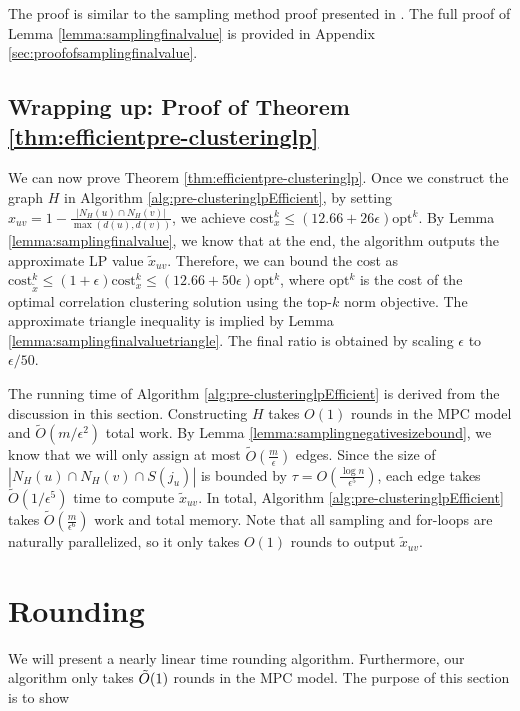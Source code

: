\documentclass[11pt]{article}
\newcommand{\cost}{\mathrm{cost}}
\newcommand{\opt}{{\mathrm{opt}}}
\begin{document}
\begin{CJK*}{UTF8}{gbsn}
The proof is similar to the sampling method proof presented in \cite{davies2023fast}. The full proof of Lemma \ref{lemma:samplingfinalvalue} is provided in Appendix \ref{sec:proofofsamplingfinalvalue}.

\subsection{Wrapping up: Proof of Theorem \ref{thm:efficientpre-clusteringlp}}

We can now prove Theorem \ref{thm:efficientpre-clusteringlp}. Once we construct the graph $H$ in Algorithm \ref{alg:pre-clusteringlpEfficient}, by setting $x_{uv} = 1 - \frac{|N_H(u) \cap N_H(v)|}{\max(d(u), d(v))}$, we achieve $\cost^k_x \leq (12.66 + 26\epsilon) \opt^k$. By Lemma \ref{lemma:samplingfinalvalue}, we know that at the end, the algorithm outputs the approximate LP value $\tilde{x}_{uv}$. Therefore, we can bound the cost as $\cost^k_{\tilde{x}} \leq (1 + \epsilon) \cost^k_x \leq (12.66 + 50\epsilon) \opt^k$, where $\opt^k$ is the cost of the optimal correlation clustering solution using the top-$k$ norm objective. The approximate triangle inequality is implied by Lemma \ref{lemma:samplingfinalvaluetriangle}. The final ratio is obtained by scaling $\epsilon$ to $\epsilon / 50$.

The running time of Algorithm \ref{alg:pre-clusteringlpEfficient} is derived from the discussion in this section. Constructing $H$ takes $O(1)$ rounds in the MPC model and $\tilde{O}(m /\epsilon^2)$ total work. By Lemma \ref{lemma:samplingnegativesizebound}, we know that we will only assign at most $\tilde{O}(\frac{m}{\epsilon})$ edges. Since the size of $|N_H(u) \cap N_H(v) \cap S(j_u)|$ is bounded by $\tau = O(\frac{\log n}{\epsilon^5})$, each edge takes $\tilde{O}(1/\epsilon^5)$ time to compute $\tilde{x}_{uv}$. In total, Algorithm \ref{alg:pre-clusteringlpEfficient} takes $\tilde{O}(\frac{m}{\epsilon^6})$ work and total memory. Note that all sampling and for-loops are naturally parallelized, so it only takes $O(1)$ rounds to output $\tilde{x}_{uv}$.



 
\section{Rounding}
\label{sec:MPC-solve-rounding}
We will present a nearly linear time rounding algorithm. Furthermore, our algorithm only takes $\Tilde{O}(1)$ rounds in the MPC model. The purpose of this section is to show 


\end{CJK*}
\end{document}
